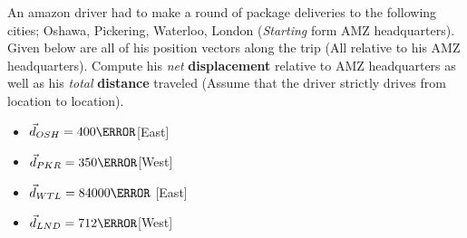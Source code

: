 \documentclass[12pt]{article} %
\begin{document}
\begin{qstn}[4]
An amazon driver had to make a round of package deliveries to the following cities; Oshawa, Pickering, Waterloo, London (\emph{Starting} form AMZ headquarters). Given below are all of his position vectors along the trip (All relative to his AMZ headquarters). Compute his \emph{net} \textbf{displacement} relative to AMZ headquarters as well as his \emph{total} \textbf{distance} traveled (Assume that the driver strictly drives from location to location).
\begin{itemize}
\item $\vec d_{OSH} = 400 \km$[East]
\item $\vec d_{PKR} = 350\km$[West]
\item $\vec d_{WTL} = 84000\m$ [East]
\item $\vec d_{LND} = 712\km$[West]
\end{itemize}




\end{qstn}
\end{document}
